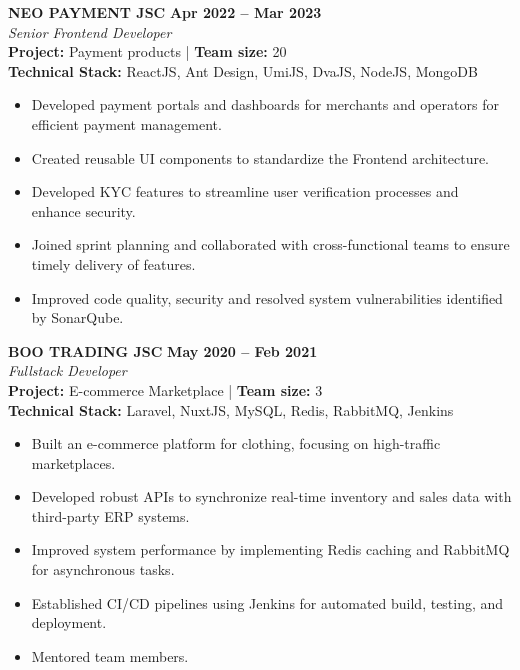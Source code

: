 \documentclass[11pt,a4paper]{article}
\begin{document}
\vspace{8pt}

\noindent \textbf{NEO PAYMENT JSC} \hfill \textbf{Apr 2022 -- Mar 2023} \\
\textit{Senior Frontend Developer} \\
\noindent \textbf{Project:} Payment products | \textbf{Team size:} 20 \\
\noindent \textbf{Technical Stack:} ReactJS, Ant Design, UmiJS, DvaJS, NodeJS, MongoDB
\begin{itemize}
    \item Developed payment portals and dashboards for merchants and operators for efficient payment management.
    \item Created reusable UI components to standardize the Frontend architecture.
    \item Developed KYC features to streamline user verification processes and enhance security.
    \item Joined sprint planning and collaborated with cross-functional teams to ensure timely delivery of features.
    \item Improved code quality, security and resolved system vulnerabilities identified by SonarQube.
\end{itemize}

\vspace{8pt}

\noindent \textbf{BOO TRADING JSC} \hfill \textbf{May 2020 -- Feb 2021} \\
\textit{Fullstack Developer} \\
\noindent \textbf{Project:} E-commerce Marketplace | \textbf{Team size:} 3 \\
\noindent \textbf{Technical Stack:} Laravel, NuxtJS, MySQL, Redis, RabbitMQ, Jenkins
\begin{itemize}
    \item Built an e-commerce platform for clothing, focusing on high-traffic marketplaces.
    \item Developed robust APIs to synchronize real-time inventory and sales data with third-party ERP systems.
    \item Improved system performance by implementing Redis caching and RabbitMQ for asynchronous tasks.
    \item Established CI/CD pipelines using Jenkins for automated build, testing, and deployment.
    \item Mentored team members.
\end{itemize}
\end{document}
